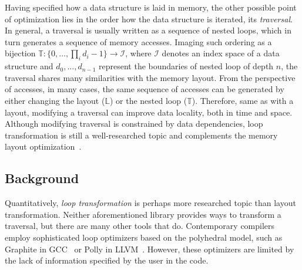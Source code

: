 Having specified how a data structure is laid in memory, the other possible point of optimization lies in the order how the data structure is iterated, its \emph{traversal}. In general, a traversal is usually written as a sequence of nested loops, which in turn generates a sequence of memory accesses. Imaging such ordering as a bijection $\mathbb{T}: \{0, \dots, \prod_{i}d_i - 1\} \to \mathcal{I}$, where $\mathcal{I}$ denotes an index space of a data structure and $d_0, \dots, d_{n-1}$ represent the boundaries of nested loop of depth $n$, the traversal shares many similarities with the memory layout. From the perspective of accesses, in many cases, the same sequence of accesses can be generated by either changing the layout ($\mathbb{L}$) or the nested loop ($\mathbb{T}$). Therefore, same as with a layout, modifying a traversal can improve data locality, both in time and space. Although modifying traversal is constrained by data dependencies, loop transformation is still a well-researched topic and complements the memory layout optimization~\cite{clauss2000automatic}.

\subsection{Background}

Quantitatively, \emph{loop transformation} is perhaps more researched topic than layout transformation. Neither aforementioned library provides ways to transform a traversal, but there are many other tools that do. Contemporary compilers employ sophisticated loop optimizers based on the polyhedral model, such as Graphite in GCC~\cite{trifunovic2010graphite} or Polly in LLVM~\cite{grosser2012polly}. However, these optimizers are limited by the lack of information specified by the user in the code.

